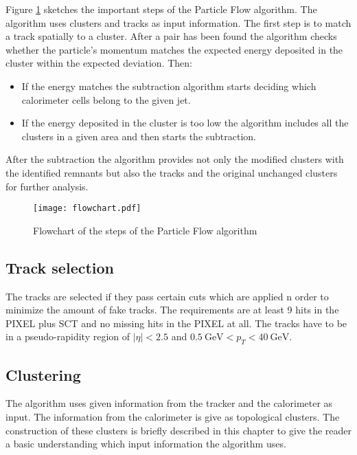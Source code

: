 Figure \ref{fig:pflowflowchart} sketches the important steps of the Particle Flow algorithm. The algorithm uses clusters and tracks as input information. The first step is to match a track spatially to a cluster. After a pair has been found the algorithm checks whether the particle's momentum matches the expected energy deposited in the cluster within the expected deviation. Then:
\begin{itemize}
\item If the energy matches the subtraction algorithm starts deciding which calorimeter cells belong to the given jet.
\item If the energy deposited in the cluster is too low the algorithm includes all the clusters in a given area and then starts the subtraction.
\end{itemize}


After the subtraction the algorithm provides not only the modified clusters with the identified remnants but also the tracks and the original unchanged clusters for further analysis.

\begin{figure}[h]
  \centering
  \texttt{[image: flowchart.pdf]}
  \caption[Flowchart of the steps of the Particle Flow algorithm]{Flowchart of the steps of the Particle Flow algorithm \cite{pflow16}}
  \label{fig:pflowflowchart}
\end{figure}

\subsection{Track selection}

The tracks are selected if they pass certain cuts which are applied n order to minimize the amount of fake tracks. The requirements are at least 9 hits in the PIXEL plus SCT and no missing hits in the PIXEL at all. The tracks have to be in a pseudo-rapidity region of $|\eta|<2.5$ and $\SI{0.5}{\GeV}<p_T<\SI{40}{\GeV}$.




\subsection{Clustering}

The algorithm uses given information from the tracker and the calorimeter as input. The information from the calorimeter is give as topological clusters. The construction of these clusters is briefly described in this chapter to give the reader a basic understanding which input information the algorithm uses.

